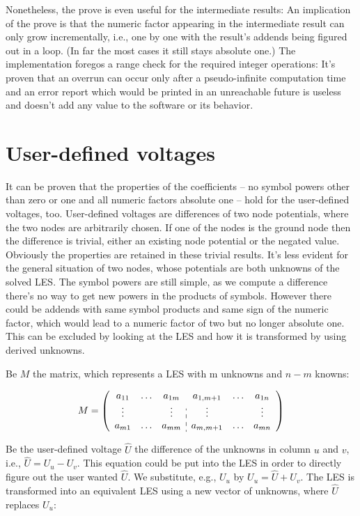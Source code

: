 Nonetheless, the prove is even useful for the intermediate results: An
implication of the prove is that the numeric factor appearing in the
intermediate result can only grow incrementally, i.e., one by one with the
result's addends being figured out in a loop. (In far the most cases it
still stays absolute one.) The implementation foregos a range check for
the required integer operations: It's proven that an overrun can occur
only after a pseudo-infinite computation time and an error report which
would be printed in an unreachable future is useless and doesn't add any
value to the software or its behavior.


\section{User-defined voltages}

It can be proven that the properties of the coefficients -- no symbol
powers other than zero or one and all numeric factors absolute one -- hold
for the user-defined voltages, too. User-defined voltages are differences
of two node potentials, where the two nodes are arbitrarily chosen. If one
of the nodes is the ground node then the difference is trivial, either an
existing node potential or the negated value. Obviously the properties are
retained in these trivial results. It's less evident for the general
situation of two nodes, whose potentials are both unknowns of the solved
LES. The symbol powers are still simple, as we compute a difference
there's no way to get new powers in the products of symbols. However there
could be addends with same symbol products and same sign of the numeric
factor, which would lead to a numeric factor of two but no longer absolute
one. This can be excluded by looking at the LES and how it is transformed
by using derived unknowns.

Be $M$ the matrix, which represents a LES with m unknowns and $n-m$
knowns:

\begin{equation*}
M =
\left(
\begin{array}{ccc:ccc}
a_{11} & \ldots & a_{1m} & a_{1, m+1} & \ldots & a_{1n} \\
\vdots &        & \vdots & \vdots     &        & \vdots \\
a_{m1} & \ldots & a_{mm} & a_{m, m+1} & \ldots & a_{mn}
\end{array}
\right)
\end{equation*}

Be the user-defined voltage $\hat U$ the difference of the unknowns in
column $u$ and $v$, i.e., $\hat U = U_u - U_v$. This equation could be put
into the LES in order to directly figure out the user wanted $\hat U$. We
substitute, e.g., $U_u$ by $U_u = \hat U + U_v$. The LES is transformed
into an equivalent LES using a new vector of unknowns, where $\hat U$
replaces $U_u$:


